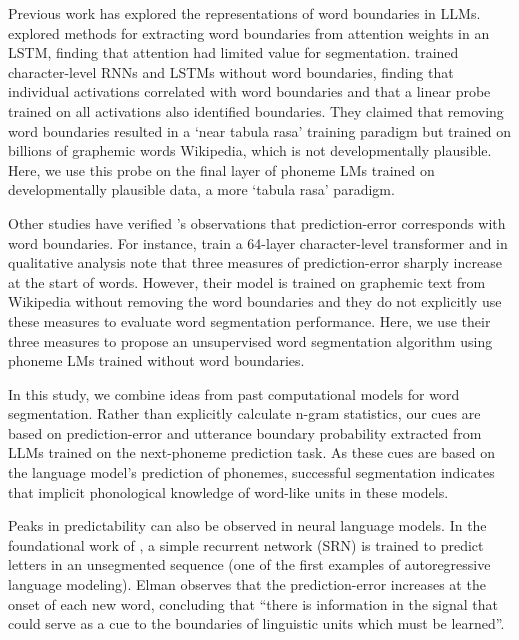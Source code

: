 Previous work has explored the representations of word boundaries in LLMs. \citet{sanabria2021difficulty} explored methods for extracting word boundaries from attention weights in an LSTM, finding that attention had limited value for segmentation. \citet{hahn-baroni-2019-tabula} trained character-level RNNs and LSTMs without word boundaries, finding that individual activations correlated with word boundaries and that a linear probe trained on all activations also identified boundaries. They claimed that removing word boundaries resulted in a `near tabula rasa' training paradigm but trained on billions of graphemic words Wikipedia, which is not developmentally plausible. Here, we use this probe on the final layer of phoneme LMs trained on developmentally plausible data, a more `tabula rasa' paradigm. 

Other studies have verified \citeauthor{elman-1990-finding}'s observations that prediction-error corresponds with word boundaries. For instance, \citet{al-rfou_character-level_2019} train a 64-layer character-level transformer and in qualitative analysis note that three measures of prediction-error sharply increase at the start of words. However, their model is trained on graphemic text from Wikipedia without removing the word boundaries and they do not explicitly use these measures to evaluate word segmentation performance. Here, we use their three measures to propose an unsupervised word segmentation algorithm using phoneme LMs trained without word boundaries.

In this study, we combine ideas from past computational models for word segmentation. Rather than explicitly calculate n-gram statistics, our cues are based on prediction-error and utterance boundary probability extracted from LLMs trained on the next-phoneme prediction task. As these cues are based on the language model's prediction of phonemes, successful segmentation indicates that implicit phonological knowledge of word-like units in these models. 

Peaks in predictability can also be observed in neural language models. In the foundational work of \citet{elman-1990-finding}, a simple recurrent network (SRN) is trained to predict letters in an unsegmented sequence (one of the first examples of autoregressive language modeling). Elman observes that the prediction-error increases at the onset of each new word, concluding that ``there is information in the signal that could serve as a cue to the boundaries of linguistic units which must be learned''.

